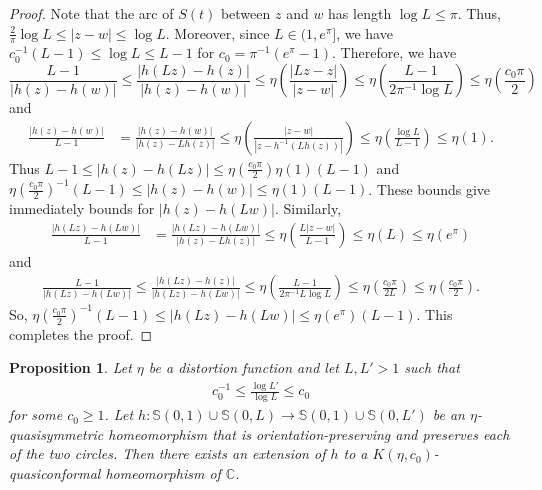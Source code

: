 \documentclass[letterpaper]{amsart}
\theoremstyle{plain}
\newtheorem{proposition}[theorem]{Proposition}
\theoremstyle{definition}
\theoremstyle{remark}
\numberwithin{equation}{section}
\numberwithin{theorem}{section}
\newcommand{\C}{\mathbb C}
\begin{document}
\begin{proof}
Note that the arc of $S(t)$ between $z$ and $w$ has length $\log L\leq \pi$. Thus, $ \frac{2}{\pi}\log L \leq |z-w|\leq \log L$. Moreover, since $L\in (1,e^{\pi}]$, we have $c_0^{-1}(L-1)\leq \log L \leq L-1$ for $c_0=\pi^{-1}(e^\pi-1)$. Therefore, we have
$$\frac{L-1}{|h(z)-h(w)|}\leq \frac{|h(Lz)-h(z)|}{|h(z)-h(w)|}\leq \eta\left( \frac{|Lz-z|}{|z-w|}\right) \leq \eta\left(\frac{L-1}{2\pi^{-1}\log L}\right)\leq \eta\left(\frac{c_0\pi}{2}\right) $$ 
and
\begin{align*}
\frac{|h(z)-h(w)|}{L-1}&=\frac{|h(z)-h(w)|}{|h(z)- Lh(z)|}\leq \eta\left( \frac{|z-w|}{|z- h^{-1}(Lh(z))|}\right)\leq \eta \left(\frac{\log L}{L-1}\right)\leq \eta(1). 
\end{align*}
Thus $L-1\leq |h(z)-h(Lz)|\leq \eta(\frac{c_0\pi}{2})\eta(1)(L-1)$ and $\eta(\frac{c_0\pi}{2})^{-1}(L-1)\leq  |h(z)-h(w)|\leq \eta(1)(L-1)$.  These bounds give immediately bounds for $|h(z)-h(Lw)|$.  Similarly, 
\begin{align*}
\frac{|h(Lz)-h(Lw)|}{L-1}& = \frac{|h(Lz)-h(Lw)|}{|h(z)-Lh(z)|} \leq \eta \left(\frac{L|z-w|}{L-1}\right)\leq \eta(L)\leq \eta(e^\pi)
\end{align*}
and
\begin{align*}
\frac{L-1}{|h(Lz)-h(Lw)|}\leq \frac{|h(Lz)-h(z)|}{|h(Lz)-h(Lw)|} \leq \eta\left(\frac{L-1}{2\pi^{-1}L\log L}\right)\leq \eta\left(\frac{c_0\pi}{2L}\right)\leq \eta\left(\frac{c_0\pi}{2}\right).
\end{align*}
So, $\eta(\frac{c_0\pi}{2})^{-1}(L-1)\leq |h(Lz)-h(Lw)|\leq \eta(e^\pi)(L-1)$. This completes the proof.
\end{proof}

\begin{proposition}\label{corollary:extension_annulus:large}
Let $\eta$ be a distortion function and let $L,L'>1$ such that
\begin{align}\label{corollary:extension_annulus:large:assumption}
c_0^{-1}\leq  \frac{\log L'}{\log L}\leq c_0
\end{align}
for some $c_0\geq 1$. Let $h\colon  \mathbb S(0,1)\cup \mathbb S(0,L) \to \mathbb S(0,1)\cup \mathbb S(0,L') $ be an $\eta$-quasisymmetric homeomorphism that is orien\-tation-preserving and preserves each of the two circles. Then there exists an extension of $h$ to a $K(\eta,c_0)$-quasi\-conformal homeomorphism of $\C$.
\end{proposition}
\end{document}
